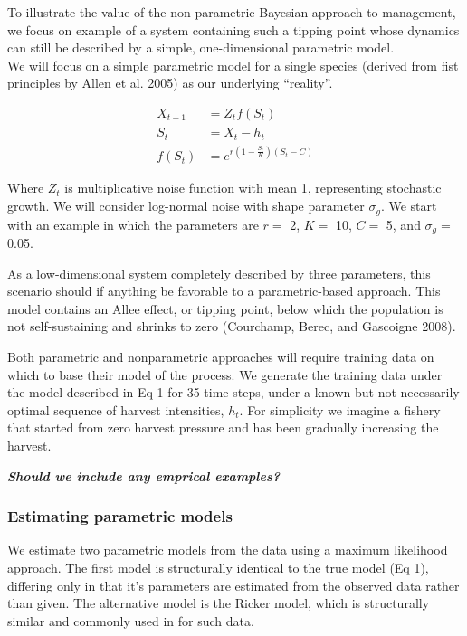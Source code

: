 \documentclass[author-year, review]{elsarticle} %
\begin{document}
To illustrate the value of the non-parametric Bayesian approach to
management, we focus on example of a system containing such a tipping
point whose dynamics can still be described by a simple, one-dimensional
parametric model.\\We will focus on a simple parametric model for a
single species (derived from fist principles by Allen et al. 2005) as
our underlying ``reality''.

\begin{align}
X_{t+1} &= Z_t f(S_t) \\
S_t &= X_t - h_t \\
f(S_t) &= e^{r \left(1 - \frac{S_t}{K}\right)\left(S_t - C\right)}
\end{align}

Where $Z_t$ is multiplicative noise function with mean 1, representing
stochastic growth. We will consider log-normal noise with shape
parameter $\sigma_g$. We start with an example in which the parameters
are $r =$ 2, $K =$ 10, $C =$ 5, and $\sigma_g =$ 0.05.

As a low-dimensional system completely described by three parameters,
this scenario should if anything be favorable to a parametric-based
approach. This model contains an Allee effect, or tipping point, below
which the population is not self-sustaining and shrinks to zero
(Courchamp, Berec, and Gascoigne 2008).

Both parametric and nonparametric approaches will require training data
on which to base their model of the process. We generate the training
data under the model described in Eq 1 for 35 time steps, under a known
but not necessarily optimal sequence of harvest intensities, $h_t$. For
simplicity we imagine a fishery that started from zero harvest pressure
and has been gradually increasing the harvest.

\textbf{\emph{Should we include any emprical examples?}}

\subsubsection{Estimating parametric models}

We estimate two parametric models from the data using a maximum
likelihood approach. The first model is structurally identical to the
true model (Eq 1), differing only in that it's parameters are estimated
from the observed data rather than given. The alternative model is the
Ricker model, which is structurally similar and commonly used in for
such data.
\end{document}
